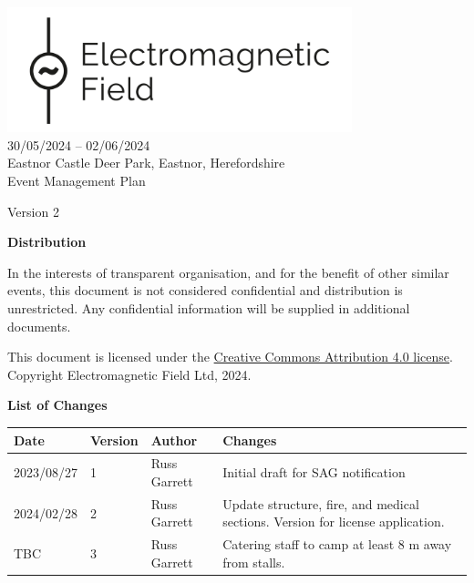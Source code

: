 

\newcommand{\st}{\textsuperscript{st} }
\newcommand{\nd}{\textsuperscript{nd} }
\renewcommand{\th}{\textsuperscript{th} }
\newcommand{\rd}{\textsuperscript{rd} }
\newcommand{\sq}{\textsuperscript{2}}




\begin{titlepage}
  \thispagestyle{empty}
  \begin{center}
    \includegraphics[width=10cm]{../resources/emf-logo.png}\\[24pt]
    {\LARGE 30/05/2024 -- 02/06/2024} \\[16pt]
    {\Large Eastnor Castle Deer Park, Eastnor, Herefordshire} \\[48pt]

    {\Large Event Management Plan}

    Version 2

    \vfill

    \begin{framed}
      \textbf{Distribution}

      In the interests of transparent organisation, and for the benefit of other similar events,
      this document is not considered confidential and distribution is unrestricted.
      Any confidential information will be supplied in additional documents.

      \footnotesize{This document is licensed under the
        \href{https://creativecommons.org/licenses/by/4.0/}{Creative Commons Attribution 4.0 license}.
        Copyright Electromagnetic Field Ltd, 2024.}
    \end{framed}

    \textbf{List of Changes}
    \begin{tabular}{l | l | l | p{9cm}}
      Date       & Version & Author       & Changes                                                                        \\
      \hline
      2023/08/27 & 1       & Russ Garrett & Initial draft for SAG notification                                             \\
      2024/02/28 & 2       & Russ Garrett & Update structure, fire, and medical sections. Version for license application. \\
      TBC        & 3       & Russ Garrett & Catering staff to camp at least 8 m away from stalls.
    \end{tabular}
  \end{center}
\end{titlepage}
\setcounter{page}{2}

\tableofcontents

\newpage



